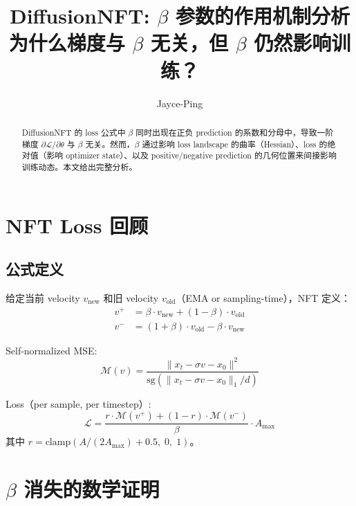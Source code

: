 \documentclass[11pt,a4paper]{article}
\title{\textbf{DiffusionNFT: $\beta$ 参数的作用机制分析}\\[0.3em]
\large 为什么梯度与 $\beta$ 无关，但 $\beta$ 仍然影响训练？}
\author{Jayce-Ping}
\date{}
\newcommand{\loss}{\mathcal{L}}
\newcommand{\sg}{\mathrm{sg}}
\theoremstyle{definition}
\begin{document}
\maketitle

\begin{abstract}
DiffusionNFT 的 loss 公式中 $\beta$ 同时出现在正负 prediction 的系数和分母中，导致一阶梯度 $\partial\loss/\partial\theta$ 与 $\beta$ 无关。然而，$\beta$ 通过影响 loss landscape 的曲率（Hessian）、loss 的绝对值（影响 optimizer state）、以及 positive/negative prediction 的几何位置来间接影响训练动态。本文给出完整分析。
\end{abstract}

\tableofcontents
\newpage

\section{NFT Loss 回顾}

\subsection{公式定义}

给定当前 velocity $v_{\text{new}}$ 和旧 velocity $v_{\text{old}}$（EMA or sampling-time），NFT 定义：
\begin{align}
v^+ &= \beta \cdot v_{\text{new}} + (1-\beta) \cdot v_{\text{old}} \label{eq:vplus}\\
v^- &= (1+\beta) \cdot v_{\text{old}} - \beta \cdot v_{\text{new}} \label{eq:vminus}
\end{align}

Self-normalized MSE:
\begin{equation}
\mathcal{M}(v) = \frac{\|x_t - \sigma v - x_0\|^2}{\sg(\|x_t - \sigma v - x_0\|_1 / d)}
\end{equation}

Loss（per sample, per timestep）:
\begin{equation}
\loss = \frac{r \cdot \mathcal{M}(v^+) + (1-r)\cdot \mathcal{M}(v^-)}{\beta} \cdot A_{\max}
\label{eq:nft_loss}
\end{equation}
其中 $r = \text{clamp}(A/(2A_{\max}) + 0.5,\; 0,\; 1)$。

\section{$\beta$ 消失的数学证明}
\label{sec:beta_cancel}
\end{document}
